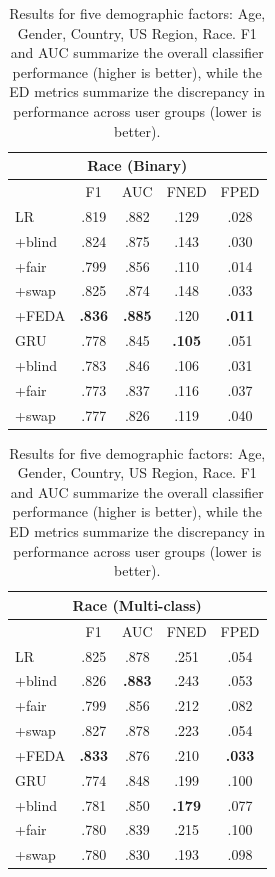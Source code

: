 \begin{table}[t!]
\begin{tabular}{l||cc|cc}
\multicolumn{5}{c}{\bf Race (Binary)} \\\hline
&F1&AUC&FNED&FPED\\\hline\hline
LR& .819 & .882 & .129 & .028\\
+blind& .824 & .875 & .143 & .030\\
+fair& .799 & .856 & .110 & .014 \\
+swap& .825 & .874 & .148 & .033  \\
+FEDA& \bf .836 & \bf .885 & .120 & \bf .011 \\
\hline
GRU& .778 & .845 & \bf .105 & .051 \\
+blind& .783 & .846 & .106 & .031\\
+fair& .773 & .837 & .116 & .037\\
+swap& .777 & .826 & .119 & .040 \\\hline
\end{tabular}
\quad
\begin{tabular}{l||cc|cc}
\multicolumn{5}{c}{\bf Race (Multi-class)} \\\hline
&F1&AUC&FNED&FPED\\\hline\hline
LR& .825 & .878 & .251 & .054 \\
+blind& .826 & \bf .883 & .243 & .053 \\
+fair& .799 & .856 & .212 & .082 \\
+swap& .827 & .878 & .223 & .054 \\
+FEDA& \bf .833 & .876 & .210 & \bf .033\\\hline
GRU& .774 & .848 & .199 & .100\\
+blind& .781 & .850 & \bf .179 & .077\\
+fair& .780 & .839 & .215 & .100\\
+swap& .780 & .830 & .193 & .098 \\\hline
\end{tabular}
\caption{Results for five demographic factors: Age, Gender, Country, US Region, Race.
F1 and AUC summarize the overall classifier performance (higher is better),
while the ED metrics summarize the discrepancy in performance across user groups (lower is better). 
}
\label{tabAll}
\end{table}



